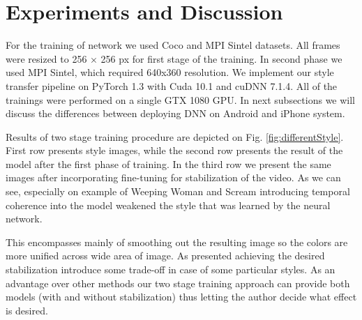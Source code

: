 \documentclass[a4paper,conference]{IEEEtran}
\begin{document}
\section{Experiments and Discussion}
\label{experiments}


For the training of network we used Coco \cite{cocoDataset} and MPI Sintel \cite{Mpi_sintel}  datasets. All frames were resized to 256 × 256 px for first stage of the training. In second phase we used MPI Sintel, which required 640x360 resolution. We implement our style transfer pipeline on PyTorch 1.3  with Cuda 10.1 and cuDNN 7.1.4. All of the trainings were performed on a single GTX 1080 GPU. In next subsections we will discuss the differences between deploying DNN on Android and iPhone system.




Results of two stage training procedure are depicted on Fig. \ref{fig:differentStyle}. First row presents style images, while the second row presents the result of the model after the first phase of training. In the third row we present the same images after incorporating fine-tuning for stabilization of the video. As we can see, especially on example of Weeping Woman and Scream introducing temporal coherence into the model weakened the style that was learned by the neural network. 

This encompasses mainly of smoothing out the resulting image so the colors are more unified across wide area of image. As presented achieving the desired stabilization introduce some trade-off in case of some particular styles. As an advantage over other methods our two stage training approach can provide both models (with and without stabilization) thus letting the author decide what effect is desired.
\end{document}
